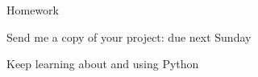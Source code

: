 \documentclass{beamer}
\begin{document}
\begin{frame}{Homework}

\vfill
{\Large Send me a copy of your project: due next Sunday}

\vfill
{\Large Keep learning about and using Python}
\vfill

\end{frame}
\end{document}
